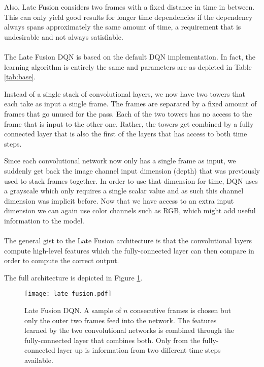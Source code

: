 Also, Late Fusion
considers two frames with a fixed distance in time in between.
This can only yield good results for longer time dependencies
if the dependency always spans approximately the same amount of time,
a requirement that is undesirable
and not always satisfiable.

\paragraph{}
The Late Fusion DQN is based on the default DQN implementation.
In fact, the learning algorithm is entirely the same
and parameters are as depicted in Table \ref{tab:base}.

Instead of a single stack of convolutional layers,
we now have two towers that each take as input a single frame.
The frames are separated by a fixed amount of frames
that go unused for the pass.
Each of the two towers has no access to the frame
that is input to the other one.
Rather, the towers get combined by a fully connected layer
that is also the first of the layers that has access
to both time steps.

Since each convolutional network now only has a single frame as input,
we suddenly get back the image channel input dimension (depth)
that was previously used to stack frames together.
In order to use that dimension for time,
DQN uses a grayscale
which only requires a single scalar value
and as such this channel dimension was implicit before.
Now that we have access to an extra input dimension
we can again use color channels
such as RGB,
which might add useful information to the model.

\paragraph{}
The general gist to the Late Fusion architecture
is that the convolutional layers
compute high-level features
which the fully-connected layer can then compare
in order to compute the correct output.

The full architecture is depicted in Figure \ref{fig:late_fusion}.

\begin{figure}[htpb]
  \centering
  \texttt{[image: late\_fusion.pdf]}
  \caption{
    Late Fusion DQN.
    A sample of $n$ consecutive frames is chosen
    but only the outer two frames
    feed into the network.
    The features learned by the two convolutional networks
    is combined through the fully-connected layer
    that combines both.
    Only from the fully-connected layer up
    is information from two different time steps available.
  }
  \label{fig:late_fusion}
\end{figure}

